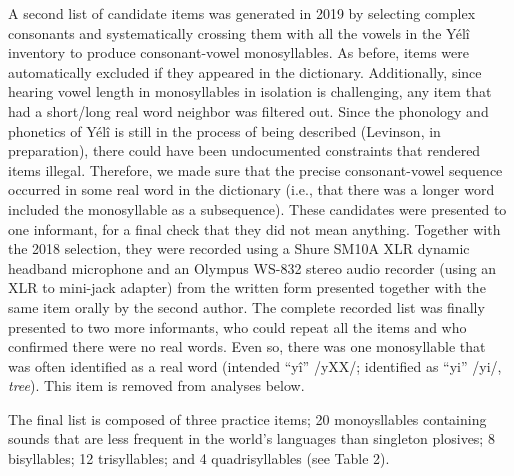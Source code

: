 \documentclass[english,,man,floatsintext]{apa6}
\begin{document}
A second list of candidate items was generated in 2019 by selecting
complex consonants and systematically crossing them with all the vowels
in the Yélî inventory to produce consonant-vowel monosyllables. As
before, items were automatically excluded if they appeared in the
dictionary. Additionally, since hearing vowel length in monosyllables in
isolation is challenging, any item that had a short/long real word
neighbor was filtered out. Since the phonology and phonetics of Yélî is
still in the process of being described (Levinson, in preparation),
there could have been undocumented constraints that rendered items
illegal. Therefore, we made sure that the precise consonant-vowel
sequence occurred in some real word in the dictionary (i.e., that there
was a longer word included the monosyllable as a subsequence). These
candidates were presented to one informant, for a final check that they
did not mean anything. Together with the 2018 selection, they were
recorded using a Shure SM10A XLR dynamic headband microphone and an
Olympus WS-832 stereo audio recorder (using an XLR to mini-jack adapter)
from the written form presented together with the same item orally by
the second author. The complete recorded list was finally presented to
two more informants, who could repeat all the items and who confirmed
there were no real words. Even so, there was one monosyllable that was
often identified as a real word (intended ``yî'' /yXX/; identified as
``yi'' /yi/, \emph{tree}). This item is removed from analyses below.

The final list is composed of three practice items; 20 monoysllables
containing sounds that are less frequent in the world's languages than
singleton plosives; 8 bisyllables; 12 trisyllables; and 4
quadrisyllables (see Table 2).
\end{document}
